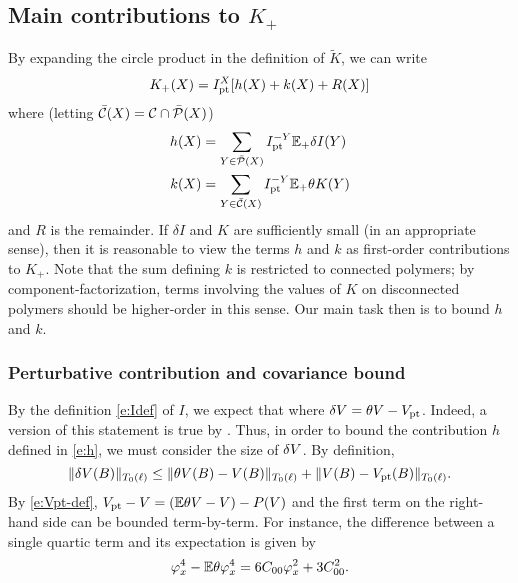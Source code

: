 
\subsection{Main contributions to \texorpdfstring{$K_+$}{K+}}

By expanding the circle product in the definition of $\tilde K$, we can write
\begin{equation}
K_+(X) = I_{\rm pt}^X [h(X) + k(X) + R(X)]
\end{equation}
where (letting $\bar{\mathcal{C}}(X) = \mathcal{C}\cap\bar{\mathcal{P}}(X)$)
\begin{align}
\label{e:hpt}
h(X)
	&=
\sum_{Y\in\bar{\mathcal{P}}(X)} I_{\rm pt}^{-Y} \mathbb{E}_+ \delta I(Y) \\
\label{e:k}
k(X)
	&=
\sum_{Y\in\bar{\mathcal{C}}(X)} I_{\rm pt}^{-Y} \mathbb{E}_+ \theta K(Y)
\end{align}
and $R$ is the remainder. If $\delta I$ and $K$ are sufficiently small (in an
appropriate sense), then it is reasonable to view the terms $h$ and $k$ as
first-order contributions to $K_+$. Note that the sum defining $k$ is restricted
to connected polymers; by component-factorization, terms involving the values
of $K$ on disconnected polymers should be higher-order in this sense.
Our main task then is to bound $h$ and $k$.

\subsubsection{Perturbative contribution and covariance bound}


By the definition \eqref{e:Idef} of $I$, we expect that 
where $\delta V = \theta V - V_{\rm pt}$. Indeed, a version of this statement is true
by \cite[Proposition~\ref{IE-prop:ip}]{BS-rg-IE}.
Thus, in order to bound the contribution $h$ defined in \eqref{e:h}, we must consider
the size of $\delta V$. By definition,
\begin{equation}
\|\delta V(B)\|_{T_0(\ell)}
	\le
\|\theta V(B) - V(B)\|_{T_0(\ell)} + \|V(B) - V_{\rm pt}(B)\|_{T_0(\ell)}.
\end{equation}
By \eqref{e:Vpt-def}, $V_{\rm pt} - V = (\mathbb{E} \theta V - V) - P(V)$ and
the first term on the right-hand side can be bounded term-by-term. For
instance, the difference between a single quartic term and its expectation
is given by
\begin{equation}
\varphi_x^4 - \mathbb{E} \theta\varphi_x^4
	=
6 C_{00} \varphi_x^2 + 3 C_{00}^2.
\end{equation}

